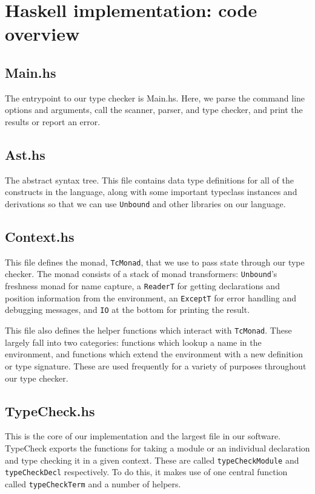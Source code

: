 \section{Haskell implementation: code overview}

\subsection{Main.hs}
The entrypoint to our type checker is Main.hs.
Here, we parse the command line options and arguments, call the scanner,
parser, and type checker, and print the results or report an error.

\subsection{Ast.hs}
The abstract syntax tree. This file contains data type definitions for all of
the constructs in the language, along with some important typeclass instances
and derivations so that we can use \texttt{Unbound} and other libraries on our
language.

\subsection{Context.hs}
This file defines the monad, \texttt{TcMonad}, that we use to pass state through our type checker.
The monad consists of a stack of monad transformers: \texttt{Unbound}'s
freshness monad for name capture, a \texttt{ReaderT} for getting declarations
and position information from the environment, an \texttt{ExceptT} for
error handling and debugging messages, and \texttt{IO} at the bottom for
printing the result.

This file also defines the helper functions which interact with
\texttt{TcMonad}. These largely fall into two categories: functions which
lookup a name in the environment, and functions which extend the environment
with a new definition or type signature. These are used frequently for a
variety of purposes throughout our type checker.

\subsection{TypeCheck.hs}
This is the core of our implementation and the largest file in our software.
TypeCheck exports the functions for taking a module or an individual
declaration and type checking it in a given context. These are called
\texttt{typeCheckModule} and \texttt{typeCheckDecl} respectively. To do this, it makes use
of one central function called \texttt{typeCheckTerm} and a number of helpers.

